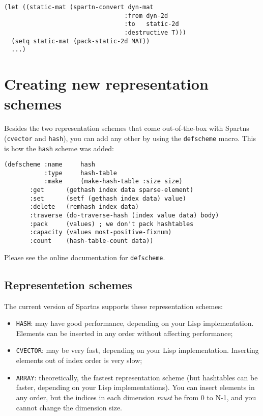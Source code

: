 \documentclass{article}
\begin{document}
\begin{lstlisting}
(let ((static-mat (spartn-convert dyn-mat
                                 :from dyn-2d
                                 :to   static-2d
                                 :destructive T)))
  (setq static-mat (pack-static-2d MAT))
  ...)
\end{lstlisting}

\section{Creating new representation schemes}

Besides the two representation schemes that come out-of-the-box with Spartns 
(\verb+cvector+ and \verb+hash+),
you can add any other by using the \verb+defscheme+ macro. This is how the \verb+hash+ scheme
was added:

\begin{lstlisting}
(defscheme :name     hash
           :type     hash-table
           :make     (make-hash-table :size size)
	   :get      (gethash index data sparse-element)
	   :set      (setf (gethash index data) value)
	   :delete   (remhash index data)
	   :traverse (do-traverse-hash (index value data) body)
	   :pack     (values) ; we don't pack hashtables
	   :capacity (values most-positive-fixnum)
	   :count    (hash-table-count data))
\end{lstlisting}

Please see the online documentation for \verb+defscheme+.

\subsection{Representetion schemes}

The current version of Spartns supports these representation schemes:

\begin{itemize}
\item \verb+HASH+: may have good performance, depending on your Lisp implementation. Elements can be
      inserted in any order without affecting performance;
\item \verb+CVECTOR+: may be very fast, depending on your Lisp implementation. Inserting elements out of
      index order is very slow;
\item \verb+ARRAY+: theoretically, the fastest representation scheme (but hashtables can be faster, depending on
      your Lisp implementations). You can insert elements in any order, but the indices
      in each dimension {\em must} be from 0 to N-1, and you cannot change the dimension size.
\end{itemize}
\end{document}
